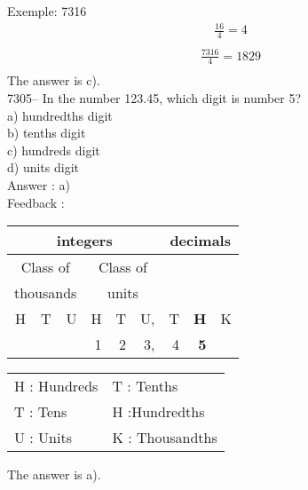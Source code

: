 \documentclass[letterpaper, 12pt]{article}
\begin{document}
Exemple: 7316
\begin{eqnarray*}
\frac{16}{4}=4\\
\end{eqnarray*}
\begin{eqnarray*}
\frac{7316}{4}=1829\\
\end{eqnarray*}
The answer is c).\\



7305-- In the number 123.45, which digit is number 5?\\

a) hundredths digit\\
b) tenths digit\\
c) hundreds digit\\
d) units digit\\

Answer : a)\\

Feedback :\\
\begin{center}
\begin{tabular}{|rrr|rrr|rrr|}
\hline
\multicolumn{6}{|c|}{integers} &\multicolumn{3}{|c|}{decimals} \\
\hline
\multicolumn{3}{|c|}{Class of} &\multicolumn{3}{|c|}{Class of} &  \multicolumn{3}{c|}{} \\
\multicolumn{3}{|c|}{thousands} &\multicolumn{3}{|c|}{units} &  \multicolumn{3}{c|}{} \\
\hline
H & T & U &H & T & U, & T\up{th} & \textbf{H\up{th}} & K\up{th} \\
\hline
\hline
&  &  & 1 & 2 & 3, & 4 & \textbf{5} &  \\
\hline
\end{tabular}
\end{center}

\scriptsize
\begin{center}
\begin{tabular}{ll}
H : Hundreds & T\up{th} : Tenths\\
T : Tens & H\up{th} :Hundredths\\
U : Units & K\up{e} : Thousandths\\
\end{tabular}
\end{center}

\normalsize

The answer is a).\\
\end{document}
